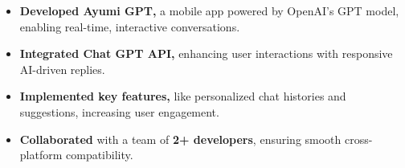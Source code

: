 \documentclass[]{deedy-resume-openfont}
\begin{document}
\begin{minipage}[t]{0.66\textwidth}
\vspace{\topsep} 
\begin{itemize}[leftmargin=*]
    \item \textbf{Developed Ayumi GPT,} a mobile app powered by OpenAI’s GPT model, enabling real-time, interactive conversations.
    \vspace{-2.5mm} %
    \item \textbf{Integrated Chat GPT API,} enhancing user interactions with responsive AI-driven replies.
    \vspace{-2.5mm}
    \item \textbf{Implemented key features,} like personalized chat histories and suggestions, increasing user engagement.
    \vspace{-2.5mm}
    \item \textbf{Collaborated} with a team of \textbf{2+ developers}, ensuring smooth cross-platform compatibility.
\end{itemize}
\sectionsep

\end{minipage} 
\end{document}
